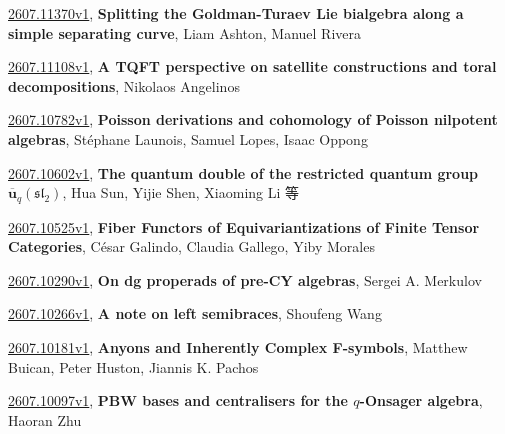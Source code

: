 \documentclass[9pt, a4paper]{article}
\theoremstyle{plain}
\theoremstyle{definition}
\theoremstyle{remark}
\newcommand{\arxiv}[3]{\href{https://arxiv.org/abs/#1}{#1}, \textbf{\textcolor{arxivblue}{#2}}, #3}
\begin{document}
\arxiv{2607.11370v1}{Splitting the Goldman-Turaev Lie bialgebra along a simple separating curve}{Liam Ashton, Manuel Rivera}

\arxiv{2607.11108v1}{A TQFT perspective on satellite constructions and toral decompositions}{Nikolaos Angelinos}

\arxiv{2607.10782v1}{Poisson derivations and cohomology of Poisson nilpotent algebras}{Stéphane Launois, Samuel Lopes, Isaac Oppong}

\arxiv{2607.10602v1}{The quantum double of the restricted quantum group $\mathbf{\overline{u}}_q(\mathfrak{sl_2})$}{Hua Sun, Yijie Shen, Xiaoming Li 等}

\arxiv{2607.10525v1}{Fiber Functors of Equivariantizations of Finite Tensor Categories}{César Galindo, Claudia Gallego, Yiby Morales}

\arxiv{2607.10290v1}{On dg properads of pre-CY algebras}{Sergei A. Merkulov}

\arxiv{2607.10266v1}{A note on left semibraces}{Shoufeng Wang}

\arxiv{2607.10181v1}{Anyons and Inherently Complex F-symbols}{Matthew Buican, Peter Huston, Jiannis K. Pachos}

\arxiv{2607.10097v1}{PBW bases and centralisers for the $q$-Onsager algebra}{Haoran Zhu}

\end{document}
